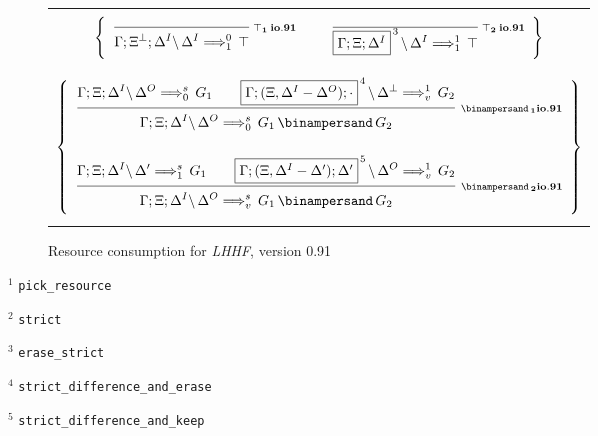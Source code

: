 \begin{figure}[t]
\begin{center}
\begin{tabular}{|c|}
      \\ \\
      $\left\{
        \begin{array}{ccc}
          \ruleI
            {}
            {\ioIXb{\G;\X^\Bot;\D^I}{\D^I}{\Top}{1}{0}}
            {\Top_1 \: io.91}
        &
          \hspace{0.5em}
        &
          \ruleI
            {}
            {\ioIXb{\fb{\G;\X;\D^I}{3}}{\D^I}{\Top}{1}{1}}
            {\Top_2 \: io.91}
        \end{array}
      \right\}$

      \\ \\ \\
      $\left\{
        \begin{array}{c}
          \ruleII
            {\ioIXb{\G;\X;\D^I}{\D^O}{G_1}{0}{s}}
            {\ioIXb{\fb{\G;(\X,\D^I-\D^O);\cdot}{4}}{\D^\Bot}{G_2}{v}{1}}
            {\ioIXb{\G;\X;\D^I}{\D^O}{G_1 \With G_2}{0}{s}}
            {\With_1 io.91}
        \\ \\
        \ruleII
          {\ioIXb{\G;\X;\D^I}{\D'}{G_1}{1}{s}}
          {\ioIXb{\fb{\G;(\X,\D^I-\D');\D'}{5}}{\D^O}{G_2}{v}{1}}
          {\ioIXb{\G;\X;\D^I}{\D^O}{G_1 \With G_2}{v}{s}}
          {\With_2 io.91}
      \end{array}
    \right\}$
    \\ \\
    \hline
  \end{tabular}

    \caption{Resource consumption for {\em LHHF}, version 0.91}
    \label{fig:RC_IXb1}
  \end{center}
\end{figure}

\bigskip

$^1$ {\tt pick\_resource}

$^2$ {\tt strict}

$^3$ {\tt erase\_strict}

$^4$ {\tt strict\_difference\_and\_erase}

$^5$ {\tt strict\_difference\_and\_keep}




